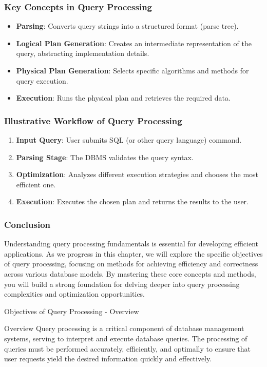 \documentclass[aspectratio=169]{beamer}
\begin{document}
\begin{frame}[fragile]
    \frametitle{Key Concepts in Query Processing}
    \begin{itemize}
        \item \textbf{Parsing}: Converts query strings into a structured format (parse tree).
        \item \textbf{Logical Plan Generation}: Creates an intermediate representation of the query, abstracting implementation details.
        \item \textbf{Physical Plan Generation}: Selects specific algorithms and methods for query execution.
        \item \textbf{Execution}: Runs the physical plan and retrieves the required data.
    \end{itemize}
\end{frame}

\begin{frame}[fragile]
    \frametitle{Illustrative Workflow of Query Processing}
    \begin{enumerate}
        \item \textbf{Input Query}: User submits SQL (or other query language) command.
        \item \textbf{Parsing Stage}: The DBMS validates the query syntax.
        \item \textbf{Optimization}: Analyzes different execution strategies and chooses the most efficient one.
        \item \textbf{Execution}: Executes the chosen plan and returns the results to the user.
    \end{enumerate}
\end{frame}

\begin{frame}[fragile]
    \frametitle{Conclusion}
    Understanding query processing fundamentals is essential for developing efficient applications. 
    As we progress in this chapter, we will explore the specific objectives of query processing, focusing on methods for achieving efficiency and correctness across various database models.  
    By mastering these core concepts and methods, you will build a strong foundation for delving deeper into query processing complexities and optimization opportunities.
\end{frame}

\begin{frame}[fragile]{Objectives of Query Processing - Overview}
    \begin{block}{Overview}
        Query processing is a critical component of database management systems, serving to interpret and execute database queries. The processing of queries must be performed accurately, efficiently, and optimally to ensure that user requests yield the desired information quickly and effectively.
    \end{block}
\end{frame}
\end{document}
